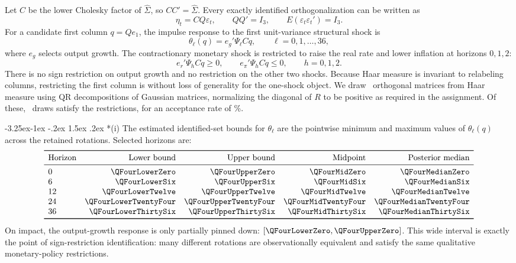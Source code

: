 \documentclass[11pt]{article}
\makeatletter
\renewcommand\subsection{\@startsection{subsection}{2}{\z@}%
  {-3.25ex\@plus -1ex \@minus -.2ex}%
  {1.5ex \@plus .2ex}%
  {\normalfont\large}}
\makeatother
\begin{document}
Let \(C\) be the lower Cholesky factor of \(\widehat\Sigma\), so \(CC'=\widehat\Sigma\).
Every exactly identified orthogonalization can be written as
\[
\eta_t=CQ\varepsilon_t,\qquad QQ'=I_3,\qquad E(\varepsilon_t\varepsilon_t')=I_3.
\]
For a candidate first column \(q=Q e_1\), the impulse response to the first
unit-variance structural shock is
\[
\theta_\ell(q)=e_g'\Psi_\ell Cq,\qquad \ell=0,1,\ldots,36,
\]
where \(e_g\) selects output growth. The contractionary monetary shock is restricted to
raise the real rate and lower inflation at horizons \(0,1,2\):
\[
e_r'\Psi_h Cq\geq 0,
\qquad
e_\pi'\Psi_h Cq\leq 0,
\qquad h=0,1,2.
\]
There is no sign restriction on output growth and no restriction on the other two shocks.
Because Haar measure is invariant to relabeling columns, restricting the first column is
without loss of generality for the one-shock object. We draw \QFourRotationDraws\
orthogonal matrices from Haar measure using QR decompositions of Gaussian matrices,
normalizing the diagonal of \(R\) to be positive as required in the assignment. Of these,
\QFourAcceptedDraws\ draws satisfy the restrictions, for an acceptance rate of
\QFourAcceptanceRate\%.

\subsection*{(i)}
The estimated identified-set bounds for \(\theta_\ell\) are the pointwise minimum and
maximum values of \(\theta_\ell(q)\) across the retained rotations. Selected horizons are:
\[
\begin{array}{lrrrr}
\toprule
\text{Horizon} & \text{Lower bound} & \text{Upper bound} & \text{Midpoint} & \text{Posterior median}\\
\midrule
0  & \QFourLowerZero & \QFourUpperZero & \QFourMidZero & \QFourMedianZero\\
6  & \QFourLowerSix & \QFourUpperSix & \QFourMidSix & \QFourMedianSix\\
12 & \QFourLowerTwelve & \QFourUpperTwelve & \QFourMidTwelve & \QFourMedianTwelve\\
24 & \QFourLowerTwentyFour & \QFourUpperTwentyFour & \QFourMidTwentyFour & \QFourMedianTwentyFour\\
36 & \QFourLowerThirtySix & \QFourUpperThirtySix & \QFourMidThirtySix & \QFourMedianThirtySix\\
\bottomrule
\end{array}
\]
On impact, the output-growth response is only partially pinned down:
\([\QFourLowerZero,\QFourUpperZero]\). This wide interval is exactly the point of
sign-restriction identification: many different rotations are observationally
equivalent and satisfy the same qualitative monetary-policy restrictions.
\end{document}
